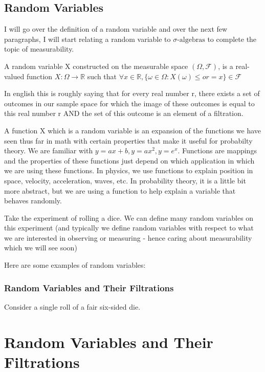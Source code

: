 \documentclass[11pt]{article}
\newcommand{\sigalg}{\sigma\text{-algebras}}
\newcommand{\filt}{\mathcal{F}}
\begin{document}
\subsection{Random Variables}

I will go over the definition of a random variable and over the next few paragraphs, I will start relating a random variable to $\sigalg$ to complete the topic of measurability.

A random variable X constructed on the measurable space $(\Omega, \filt)$, is a real-valued function $X: \Omega \rightarrow \mathbb{R}$ such that $\forall x \in \mathbb{R}, \{\omega \in \Omega : X(\omega) \le or = x \}  \in \filt$

In english this is roughly saying that for every real number r, there exists a set of outcomes in our sample space for which the image of these outcomes is equal to this real number r AND the set of this outcome is an element of a filtration.

A function X which is a random variable is an expansion of the functions we have seen thus far in math with certain properties that make it useful for probabilty theory. We are familiar with $y=ax+b, y=ax^2, y = e^x$. Functions are mappings and the properties of these functions just depend on which application in which we are using these functions. In physics, we use functions to explain position in space, velocity, acceleration, waves, etc. In probability theory, it is a little bit more abstract, but we are using a function to help explain a variable that behaves randomly.

Take the experiment of rolling a dice. We can define many random variables on this experiment (and typically we define random variables with respect to what we are interested in observing or measuring - hence caring about measurability which we will see soon)

Here are some examples of random variables:

\subsubsection*{Random Variables and Their Filtrations}

Consider a single roll of a fair six-sided die.

\section*{Random Variables and Their Filtrations}
\end{document}

